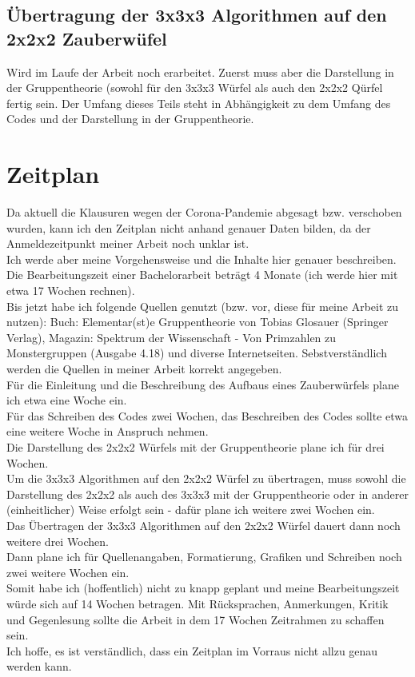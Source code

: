 \documentclass[12pt,a4paper, usenames, dvipsnames]{scrartcl}
\begin{document}
\subsection*{Übertragung der 3x3x3 Algorithmen auf den 2x2x2 Zauberwüfel}

Wird im Laufe der Arbeit noch erarbeitet. Zuerst muss aber die Darstellung in der Gruppentheorie (sowohl für den 3x3x3 Würfel als auch den 2x2x2 Qürfel fertig sein. Der Umfang dieses Teils steht in Abhängigkeit zu dem Umfang des Codes und der Darstellung in der Gruppentheorie. \\

\newpage


\section{Zeitplan}
Da aktuell die Klausuren wegen der Corona-Pandemie abgesagt bzw. verschoben wurden, kann ich den Zeitplan nicht anhand genauer Daten bilden, da der Anmeldezeitpunkt meiner Arbeit noch unklar ist. \\
Ich werde aber meine Vorgehensweise und die Inhalte hier genauer beschreiben. \\
Die Bearbeitungszeit einer Bachelorarbeit beträgt 4 Monate (ich werde hier mit etwa 17 Wochen rechnen). \\
Bis jetzt habe ich folgende Quellen genutzt (bzw. vor, diese für  meine Arbeit zu nutzen): Buch: Elementar(st)e Gruppentheorie von Tobias Glosauer (Springer Verlag), Magazin: Spektrum der Wissenschaft - Von Primzahlen zu Monstergruppen (Ausgabe 4.18) und diverse Internetseiten. Sebstverständlich werden die Quellen in meiner Arbeit korrekt angegeben. \\
Für die Einleitung und die Beschreibung des Aufbaus eines Zauberwürfels plane ich etwa eine Woche ein. \\
Für das Schreiben des Codes zwei Wochen, das Beschreiben des Codes sollte etwa eine weitere Woche in Anspruch nehmen. \\
Die Darstellung des 2x2x2 Würfels mit der Gruppentheorie plane ich für drei Wochen. \\
Um die 3x3x3 Algorithmen auf den 2x2x2 Würfel zu übertragen, muss sowohl die Darstellung des 2x2x2 als auch des 3x3x3 mit der Gruppentheorie oder in anderer (einheitlicher) Weise erfolgt sein - dafür plane ich weitere zwei Wochen ein. \\
Das Übertragen der 3x3x3 Algorithmen auf den 2x2x2 Würfel dauert dann noch weitere drei Wochen. \\
Dann plane ich für Quellenangaben, Formatierung, Grafiken und Schreiben noch zwei weitere Wochen ein. \\
Somit habe ich (hoffentlich) nicht zu knapp geplant und meine Bearbeitungszeit würde sich auf 14 Wochen betragen. Mit Rücksprachen, Anmerkungen, Kritik und Gegenlesung sollte die Arbeit in dem 17 Wochen Zeitrahmen zu schaffen sein. \\ 
Ich hoffe, es ist verständlich, dass ein Zeitplan im Vorraus nicht allzu genau werden kann. \\
\end{document}
